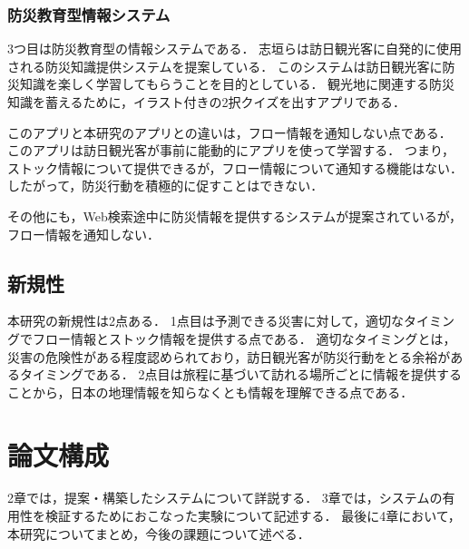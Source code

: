 \documentclass[a4paper,11pt,oneside,openany]{jsbook}
\begin{document}
\subsubsection{防災教育型情報システム}
3つ目は防災教育型の情報システムである．
志垣ら\cite{1390855511130932864}は訪日観光客に自発的に使用される防災知識提供システムを提案している．
このシステムは訪日観光客に防災知識を楽しく学習してもらうことを目的としている．
観光地に関連する防災知識を蓄えるために，イラスト付きの2択クイズを出すアプリである．

このアプリと本研究のアプリとの違いは，フロー情報を通知しない点である．
このアプリは訪日観光客が事前に能動的にアプリを使って学習する．
つまり，ストック情報について提供できるが，フロー情報について通知する機能はない．
したがって，防災行動を積極的に促すことはできない．

その他にも，Web検索途中に防災情報を提供するシステム\cite{1050292572146543616}が提案されているが，フロー情報を通知しない．

\subsection{新規性}
本研究の新規性は2点ある．
1点目は予測できる災害に対して，適切なタイミングでフロー情報とストック情報を提供する点である．
適切なタイミングとは，災害の危険性がある程度認められており，訪日観光客が防災行動をとる余裕があるタイミングである．
2点目は旅程に基づいて訪れる場所ごとに情報を提供することから，日本の地理情報を知らなくとも情報を理解できる点である．

\section{論文構成}
2章では，提案・構築したシステムについて詳説する．
3章では，システムの有用性を検証するためにおこなった実験について記述する．
最後に4章において，本研究についてまとめ，今後の課題について述べる．
\end{document}
